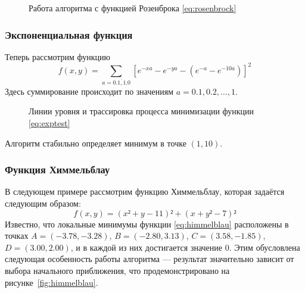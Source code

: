 \begin{figure}[!thb]
  \centering
  \caption[Функция Розенброка]{Работа алгоритма с функцией Розенброка
    \eqref{eq:rosenbrock}}
\end{figure}
\clearpage

\subsubsection{Экспоненциальная функция}

Теперь рассмотрим функцию
\begin{equation}
  \label{eq:exptest}
  f(x, y) = \sum\limits_{a=\overline{0.1, 1.0}}\left [
    e^{-xa}-e^{-ya}-(e^{-a}-e^{-10a})\right ]^2
\end{equation}
Здесь суммирование происходит по значениям $a = 0.1, 0.2, \dotsc, 1$.

\begin{figure}[!thb]
  \centering
  \caption[Экспоненциальная функция]{Линии уровня и трассировка процесса минимизации функции
    \eqref{eq:exptest}}
\end{figure}

Алгоритм стабильно определяет минимум в точке $(1, 10)$.

\subsubsection{Функция Химмельблау}

В следующем примере рассмотрим функцию Химмельблау, которая задаётся
следующим образом:
\begin{equation}
  \label{eq:himmelblau}
  f(x, y) = (x² + y - 11)² + (x + y² - 7)²
\end{equation}
Известно, что локальные минимумы функции \eqref{eq:himmelblau}
расположены в точках $A=(-3.78, -3.28)$, $B=(-2.80, 3.13)$, $C=(3.58,
-1.85)$, $D=(3.00, 2.00)$, и в каждой из них достигается значение $0$.
Этим обусловлена следующая особенность работы алгоритма — результат
значительно зависит от выбора начального приближения, что
продемонстрировано на рисунке \ref{fig:himmelblau}.

